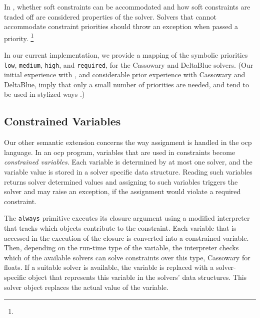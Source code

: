 In \langname, whether soft constraints can be accommodated and how
soft constraints are traded off are considered properties of the
solver. Solvers that cannot accommodate constraint priorities should
throw an exception when passed a priority. \DIFaddbegin {}\zthree {}\footnote{\zthree {}}

\DIFaddend In our current implementation, we provide a mapping of the symbolic
priorities \lstinline{low}, \lstinline{medium}, \lstinline{high}, and
\lstinline{required}, for the Cassowary and DeltaBlue solvers.  (Our
initial experience with \toolname, and considerable prior experience
with Cassowary and DeltaBlue, imply that only a small number of
priorities are needed, and tend to be used in stylized ways
\cite{badros-tochi-2001}.)

\subsection{Constrained Variables}
\label{sec:constrained-variables}
Our other semantic extension concerns the way assignment is handled in the
\acrlong{ocp} language. In an \ac{ocp} program, variables that are
used in constraints become \emph{constrained variables}. Each variable
is determined by at most one solver, and the variable value is stored
in a solver specific data structure. Reading such variables returns
solver determined values and assigning to such variables triggers the
solver and may raise an exception, if the assignment would violate a
required constraint.

The \lstinline{always} primitive executes its closure argument using a
modified interpreter that tracks which objects contribute to the
constraint. Each variable that is accessed in the execution of the
closure is converted into a constrained variable. Then, depending on
the run-time type of the variable, the interpreter checks which of the
available solvers can solve constraints over this type, \eg Cassowary
for floats. If a suitable solver is available, the variable is
replaced with a solver-specific object that represents this variable
in the solvers' data structures. This solver object replaces the
actual value of the variable.

